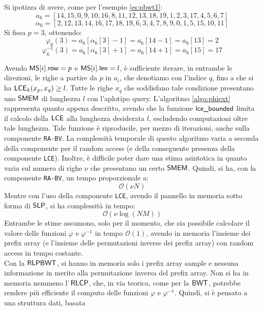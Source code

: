 \begin{esempio}
  Si ipotizza di avere, come per l'esempio \ref{es:pbwt1}:
  \[a_6=[14,15,0,9,10,16,8,11,12,13,18,19,1,2,3,17,4,5,6,7]\]
  \[\alpha_6=[2,12,13,14,16,17,18,19,6,3,4,7,8,9,0,1,5,15,10,11]\]
  Si fissa $p=3$, ottenendo:
  \[\varphi_6(3)=a_6[\alpha_6[3]-1]=a_6[14-1]=a_6[13]=2\]
  \[\varphi^{-1}_6(3)=a_6[\alpha_6[3]+1]=a_6[14+1]=a_6[15]=17\]
\end{esempio}
Avendo $\mbox{\rm {\sf MS}}[i].\mbox{\rm {\sf row}}=p$ e $\mbox{\rm {\sf MS}}[i].\mbox{\rm {\sf len}}=l$, è sufficiente iterare, in entrambe le
direzioni, le righe a
partire da 
$p$ in $a_i$, che denotiamo con l'indice $q$, fino a che si ha 
$\mbox{\rm {\sf LCE}}_k(x_p, x_q)\geq l$.
Tutte le righe $x_q$ che soddisfano tale condizione presentano uno
$\mbox{\rm {\sf SMEM}}$ di lunghezza $l$ con 
l'aplotipo query. L'algoritmo \ref{algo:phiext} rappresenta quanto
appena descritto, avendo che la funzione $\mbox{\rm {\sf lce\_bounded}}$ limita il calcolo
della 
$\mbox{\rm {\sf LCE}}$ alla lunghezza desiderata $l$, escludendo computazioni oltre tale
lunghezza. Tale funzione è riproducile, per mezzo di iterazioni, anche sulla
componente \texttt{RA-BV}. La complessità temporale di questo algoritmo
varia a seconda della componente per il random access (e della conseguente
presenza della 
componente \texttt{LCE}). Inoltre, è difficile poter dare una stima asintotica
in quanto varia sul numero di righe $\nu$ che presentano un certo
$\mbox{\rm {\sf SMEM}}$. Quindi, si ha, con la 
componente \texttt{RA-BV}, un tempo proporzionale a:
\begin{equation}
  \label{eq:phiaccbv}
  \mathcal{O}(\nu N)
\end{equation}
Mentre con l'uso della componente \texttt{LCE}, avendo il pannello in memoria
sotto forma di $\mbox{\rm {\sf SLP}}$, si ha complessità in tempo:
\begin{equation}
  \label{eq:phiaccbv2}
  \mathcal{O}(\nu\log (\mathit{NM}))
\end{equation}
Entrambe le stime assumono, solo per il momento, che sia possibile calcolare il
valore delle funzioni $\varphi$ e $\varphi^{-1}$ in tempo $\mathcal{O}(1)$,
avendo in 
memoria l'insieme dei prefix array (e l'insieme delle permutazioni inverse dei
prefix array) con random access in tempo costante.\\
\noindent
Con la $\mbox{\rm {\sf RLPBWT}}$,
si hanno in memoria solo i prefix array sample e nessuna informazione in merito
alla permutazione inversa del 
prefix array. Non si ha in memoria nemmeno l'$\,\mbox{\rm {\sf RLCP}}$, che, in via teorica,
come per la $\mbox{\rm {\sf BWT}}$, potrebbe rendere più efficiente il computo delle funzioni
$\varphi$ 
e $\varphi^{-1}$. Quindi, si è pensato a una struttura dati, basata

